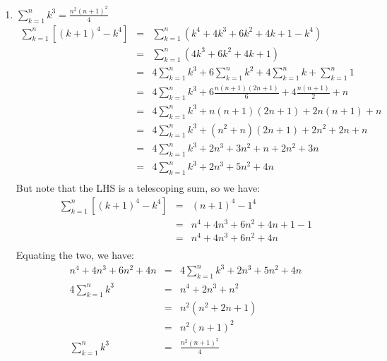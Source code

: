 \documentclass[letterpaper,12pt,fleqn]{article}
\begin{document}
\begin{theproof}
\begin{enumerate}
\item $\sum_{k=1}^nk^3=\frac{n^2(n+1)^2}{4}$
\begin{eqnarray*}
\sum_{k=1}^n[(k+1)^4-k^4] &=& \sum_{k=1}^n(k^4+4k^3+6k^2+4k+1-k^4) \\
    &=& \sum_{k=1}^n(4k^3+6k^2+4k+1) \\
    &=& 4\sum_{k=1}^nk^3+6\sum_{k=1}^nk^2+4\sum_{k=1}^nk+\sum_{k=1}^n1 \\
    &=& 4\sum_{k=1}^nk^3 + 6\frac{n(n+1)(2n+1)}{6}+4\frac{n(n+1)}{2}+n \\
    &=& 4\sum_{k=1}^nk^3+n(n+1)(2n+1)+2n(n+1)+n \\
    &=& 4\sum_{k=1}^nk^3+(n^2+n)(2n+1)+2n^2+2n+n \\
    &=& 4\sum_{k=1}^nk^3+2n^3+3n^2+n+2n^2+3n \\
    &=& 4\sum_{k=1}^nk^3+2n^3+5n^2+4n \\
\end{eqnarray*}
But note that the LHS is a telescoping sum, so we have:
\begin{eqnarray*}
\sum_{k=1}^n[(k+1)^4-k^4] &=& (n+1)^4-1^4 \\
    &=& n^4+4n^3+6n^2+4n+1-1 \\
    &=& n^4+4n^3+6n^2+4n \\
\end{eqnarray*}
Equating the two, we have:
\begin{eqnarray*}
n^4+4n^3+6n^2+4n &=& 4\sum_{k=1}^nk^3+2n^3+5n^2+4n \\
4\sum_{k=1}^nk^3 &=& n^4+2n^3+n^2 \\
    &=& n^2(n^2+2n+1) \\
    &=& n^2(n+1)^2 \\
\sum_{k=1}^nk^3 &=& \frac{n^2(n+1)^2}{4} \\
\end{eqnarray*}
\end{enumerate}
\end{theproof}
\end{document}
